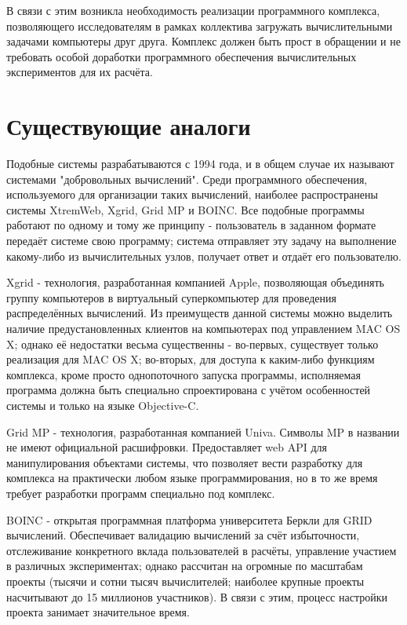 \documentclass[a4paper,12pt]{report}
\numberwithin{equation}{section}
\begin{document}
В связи с этим возникла необходимость реализации программного комплекса, позволяющего исследователям в рамках коллектива загружать вычислительными задачами компьютеры друг друга.
Комплекс должен быть прост в обращении и не требовать особой доработки программного обеспечения вычислительных экспериментов для их расчёта.

\clearpage
\section{Существующие аналоги}

Подобные системы разрабатываются с 1994 года, и в общем случае их называют системами "добровольных вычислений".
Среди программного обеспечения, используемого для организации таких вычислений, наиболее распространены системы XtremWeb, Xgrid, Grid MP и BOINC.
Все подобные программы работают по одному и тому же принципу - пользователь в заданном формате передаёт системе свою программу; система отправляет эту задачу на выполнение какому-либо из вычислительных узлов, получает ответ и отдаёт его пользователю.

Xgrid - технология, разработанная компанией Apple, позволяющая объединять группу компьютеров в виртуальный суперкомпьютер для проведения распределённых вычислений. 
Из преимуществ данной системы можно выделить наличие предустановленных клиентов на компьютерах под управлением MAC OS X; однако её недостатки весьма существенны - во-первых, существует только реализация для MAC OS X; во-вторых, для доступа к каким-либо функциям комплекса, кроме просто однопоточного запуска программы, исполняемая программа должна быть специально спроектирована с учётом особенностей системы и только на языке Objective-C.

Grid MP - технология, разработанная компанией Univa. Символы MP в названии не имеют официальной расшифровки. 
Предоставляет web API для манипулирования объектами системы, что позволяет вести разработку для комплекса на практически любом языке программирования, но в то же время требует разработки программ специально под комплекс.

BOINC - открытая программная платформа университета Беркли для GRID вычислений. 
Обеспечивает валидацию вычислений за счёт избыточности, отслеживание конкретного вклада пользователей в расчёты, управление участием в различных экспериментах; однако рассчитан на огромные по масштабам проекты (тысячи и сотни тысяч вычислителей; наиболее крупные проекты насчитывают до 15 миллионов участников). 
В связи с этим, процесс настройки проекта занимает значительное время.
\end{document}
